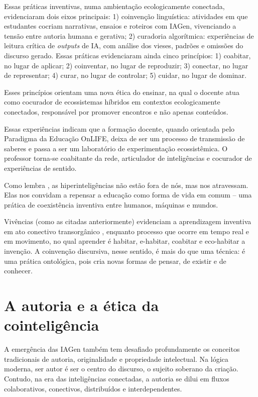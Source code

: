 \documentclass[portuguese]{textolivre}
\begin{document}
Essas práticas inventivas, numa ambientação ecologicamente conectada, evidenciaram dois eixos principais: 1) coinvenção linguística: atividades em que estudantes cocriam narrativas, ensaios e roteiros com IAGen, vivenciando a tensão entre autoria humana e gerativa; 2) curadoria algorítmica: experiências de leitura crítica de \textit{outputs} de IA, com análise dos vieses, padrões e omissões do discurso gerado. Essas práticas evidenciaram ainda cinco princípios: 1) coabitar, no lugar de aplicar; 2) coinventar, no lugar de reproduzir; 3) conectar, no lugar de representar; 4) curar, no lugar de controlar; 5) cuidar, no lugar de dominar. 

Esses princípios orientam uma nova ética do ensinar, na qual o docente atua como cocurador de ecossistemas híbridos em contextos ecologicamente conectados, responsável por promover encontros e não apenas conteúdos.

Essas experiências indicam que a formação docente, quando orientada pelo Paradigma da Educação OnLIFE, deixa de ser um processo de transmissão de saberes e passa a ser um laboratório de experimentação ecossistêmica. O professor torna-se coabitante da rede, articulador de inteligências e cocurador de experiências de sentido.

Como lembra \textcite{difelice2023depoisdonatural}, as hiperinteligências não estão fora de nós, mas nos atravessam. Elas nos convidam a repensar a educação como forma de vida em comum – uma prática de coexistência inventiva entre humanos, máquinas e mundos.

Vivências (como as citadas anteriormente) evidenciam a aprendizagem inventiva em ato conectivo transorgânico \cite{schlemmer2023protagonismo}, enquanto processo que ocorre em tempo real e em movimento, no qual aprender é habitar, e-habitar, coabitar e eco-habitar a invenção. A coinvenção discursiva, nesse sentido, é mais do que uma técnica: é uma prática ontológica, pois cria novas formas de pensar, de existir e de conhecer.

\section{A autoria e a ética da cointeligência}\label{sec-6}
A emergência das IAGen também tem desafiado profundamente os conceitos tradicionais de autoria, originalidade e propriedade intelectual. Na lógica moderna, ser autor é ser o centro do discurso, o sujeito soberano da criação. Contudo, na era das inteligências conectadas, a autoria se dilui em fluxos colaborativos, conectivos, distribuídos e interdependentes.
\end{document}
